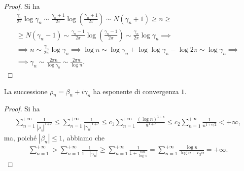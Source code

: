 \begin{proof}
  Si ha
  \begin{gather*}
    \frac{\gamma_n}{2\pi}\log{\gamma_n} \sim \frac{\gamma_n+1}{2\pi}\log\left(\frac{\gamma_n+1}{2\pi}\right) \sim N(\gamma_n+1) \ge n \ge \\
    \ge N(\gamma_n-1) \sim \frac{\gamma_n-1}{2\pi}\log\left(\frac{\gamma_n-1}{2\pi}\right) \sim \frac{\gamma_n}{2\pi}\log{\gamma_n} \implies \\
    \implies n \sim \frac{\gamma_n}{2\pi}\log{\gamma_n} \implies \log{n} \sim \log{\gamma_n}+\log\log{\gamma_n}-\log{2\pi} \sim \log{\gamma_n} \implies \\
    \implies \gamma_n \sim \frac{2\pi n}{\log{\gamma_n}} \sim \frac{2\pi n}{\log{n}}.
  \end{gather*}
\end{proof}

\begin{cor}
  La successione $\rho_n=\beta_n+i\gamma_n$ ha esponente di convergenza $1$.
\end{cor}

\begin{proof}
  Si ha
  \begin{gather*}
    \sum_{n=1}^{+\infty} \frac{1}{|\rho_n|^{1+\epsilon}} \le \sum_{n=1}^{+\infty} \frac{1}{|\gamma_n|^{1+\epsilon}} \le c_1 \sum_{n=1}^{+\infty} \frac{(\log{n})^{1+\epsilon}}{n^{1+\epsilon}} \le c_2 \sum_{n=1}^{+\infty} \frac{1}{n^{1+\epsilon/2}}<+\infty,
  \end{gather*}
  ma, poiché $|\beta_n| \le 1$, abbiamo che
  \begin{gather*}
    \sum_{n=1}^{+\infty}>\sum_{n=1}^{+\infty} \frac{1}{1+|\gamma_n|} \ge \sum_{n=1}^{+\infty} \frac{1}{1+\frac{c_3n}{\log{n}}}=\sum_{n=1}^{+\infty} \frac{\log{n}}{\log{n}+c_3n}=+\infty.
  \end{gather*}
\end{proof}
